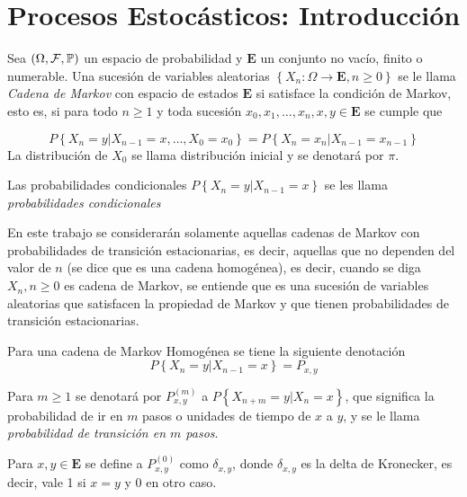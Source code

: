 
\section{Procesos Estocásticos: Introducción}

\begin{Def}
Sea $\left(\Omega,\mathcal{F},\mathbb{P}\right)$ un espacio de probabilidad y $\mathbf{E}$ un conjunto no vacío, finito o numerable. Una sucesión de variables aleatorias $\left\{X_{n}:\Omega\rightarrow\mathbf{E},n\geq0\right\}$ se le llama \textit{Cadena de Markov} con espacio de estados $\mathbf{E}$ si satisface la condición de Markov, esto es, si para todo $n\geq1$ y toda sucesión $x_{0},x_{1},\ldots,x_{n},x,y\in\mathbf{E}$ se cumple que 

\begin{equation}
P\left\{X_{n}=y|X_{n-1}=x,\ldots,X_{0}=x_{0}\right\}=P\left\{X_{n}=x_{n}|X_{n-1}=x_{n-1}\right\}
\end{equation}
La distribución de $X_{0}$ se llama distribución inicial y se denotará por $\pi$.
\end{Def}

Las probabilidades condicionales $P\left\{X_{n}=y|X_{n-1}=x\right\}$ se les llama \textit{probabilidades condicionales}


En este trabajo se considerarán solamente aquellas cadenas de Markov con probabilidades de transición estacionarias, es decir, aquellas que no dependen del valor de $n$ (se dice que es una cadena homogénea), es decir, cuando se diga $X_{n},n\geq0$ es cadena de Markov, se entiende que es una sucesión de variables aleatorias que satisfacen la propiedad de Markov y que tienen probabilidades de transición estacionarias.

\begin{Note}
Para una cadena de Markov Homogénea se tiene la siguiente denotación
\begin{equation}
P\left\{X_{n}=y|X_{n-1}=x\right\}=P_{x,y}
\end{equation}
\end{Note}

\begin{Note}
Para $m\geq1$ se denotará por $P^{(m)}_{x,y}$ a $P\left\{X_{n+m}=y|X_{n}=x\right\}$, que significa la probabilidad de ir en $m$ pasos o unidades de tiempo de $x$ a $y$, y se le llama \textit{probabilidad de transición en $m$ pasos}.
\end{Note}

\begin{Note}
Para $x,y\in\mathbf{E}$ se define a $P^{(0)}_{x,y}$ como $\delta_{x,y}$, donde $\delta_{x,y}$ es la delta de Kronecker, es decir, vale 1 si $x=y$ y 0 en otro caso.
\end{Note}


